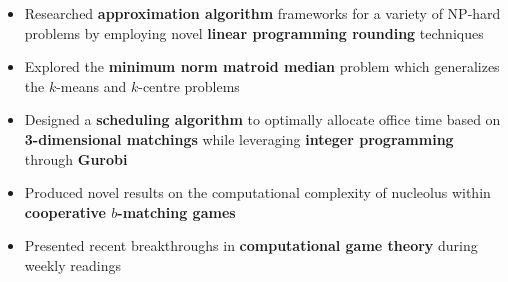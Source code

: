 \documentclass[10pt,a4paper,ragged2e]{altacv}
\begin{document}
\tagline{}{}

\begin{fullwidth}
    \makecvheader
\end{fullwidth}



\begin{itemize}
    \item Researched \textbf{approximation algorithm} frameworks for a variety of NP-hard problems
      by employing novel \textbf{linear programming rounding} techniques
    \item Explored the \textbf{minimum norm matroid median} problem
      which generalizes the $k$-means and $k$-centre problems
\end{itemize}

\divider

\begin{itemize}
    \item Designed a \textbf{scheduling algorithm} to optimally allocate office time
      based on \textbf{3-dimensional matchings} while leveraging \textbf{integer programming} through \textbf{Gurobi}
    \item Produced novel results on the computational complexity of nucleolus
      within \textbf{cooperative $b$-matching games}
    \item Presented recent breakthroughs in \textbf{computational game theory} during weekly readings
\end{itemize}

\divider
\end{document}
